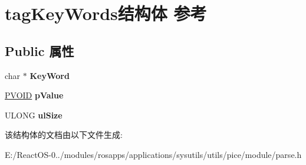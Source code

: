 \hypertarget{structtag_key_words}{}\section{tag\+Key\+Words结构体 参考}
\label{structtag_key_words}
\subsection*{Public 属性}
\begin{DoxyCompactItemize}
\item 
\mbox{\label{structtag_key_words_a615f090e3e4b90692557f3e7434102c1}} 
char $\ast$ {\bfseries Key\+Word}
\item 
\mbox{\label{structtag_key_words_a0cf4e8a59eab7a027da07d10753851db}} 
\hyperlink{interfacevoid}{P\+V\+O\+ID} {\bfseries p\+Value}
\item 
\mbox{\label{structtag_key_words_acb083e45df0d5e17f5c8046d8b4e1c94}} 
U\+L\+O\+NG {\bfseries ul\+Size}
\end{DoxyCompactItemize}


该结构体的文档由以下文件生成\+:\begin{DoxyCompactItemize}
\item 
E\+:/\+React\+O\+S-\/0../modules/rosapps/applications/sysutils/utils/pice/module/parse.\+h\end{DoxyCompactItemize}
